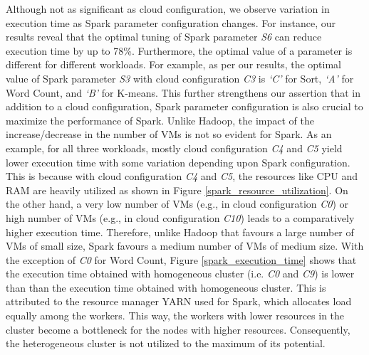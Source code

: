 \documentclass[3p]{elsarticle}
\begin{document}
Although not as significant as cloud configuration, we observe variation in execution time as Spark parameter configuration changes. For instance, our results reveal that the optimal tuning of Spark parameter \textit{S6} can reduce execution time by up to 78\%. Furthermore, the optimal value of a parameter is different for different workloads. For example, as per our results, the optimal value of Spark parameter \textit{S3} with cloud configuration \textit{C3} is \textit{‘C’} for Sort, \textit{‘A’} for Word Count, and \textit{‘B’} for K-means. This further strengthens our assertion that in addition to a cloud configuration, Spark parameter configuration is also crucial to maximize the performance of Spark. Unlike Hadoop, the impact of the increase/decrease in the number of VMs is not so evident for Spark. As an example, for all three workloads, mostly cloud configuration \textit{C4} and \textit{C5} yield lower execution time with some variation depending upon Spark configuration. This is because with cloud configuration \textit{C4} and \textit{C5}, the resources like CPU and RAM are heavily utilized as shown in Figure \ref{spark_resource_utilization}. On the other hand, a very low number of VMs (e.g., in cloud configuration \textit{C0}) or high number of VMs (e.g., in cloud configuration \textit{C10}) leads to a comparatively higher execution time. Therefore, unlike Hadoop that favours a large number of VMs of small size, Spark favours a medium number of VMs of medium size. With the exception of \textit{C0} for Word Count, Figure \ref{spark_execution_time} shows that the execution time obtained with homogeneous cluster (i.e. \textit{C0} and \textit{C9}) is lower than than the execution time obtained with homogeneous cluster. This is attributed to the resource manager YARN used for Spark, which allocates load equally among the workers. This way, the workers with lower resources in the cluster become a bottleneck for the nodes with higher resources. Consequently, the heterogeneous cluster is not utilized to the maximum of its potential.
\end{document}
